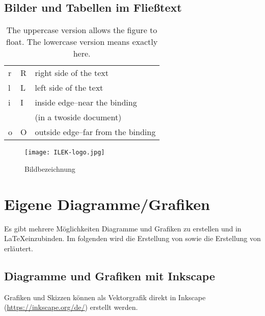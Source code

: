 \newpage

\subsection{Bilder und Tabellen im Fließtext}

\begin{wraptable}[]{o}[0cm]{9cm}
	\begin{center}
		\begin{tabular}{|l|l|l|}
			\hline
			r & R & right side of the text\\
			l & L & left side of the text\\
			i & I & inside edge–near the binding\\
			& &  (in a twoside document)\\
			o & O & outside edge–far from the binding\\
			\hline
		\end{tabular}
	\end{center}
	\caption{The uppercase version allows the figure to float. The lowercase version means exactly here.}%
\end{wraptable}

\blindtext[2]

\begin{wrapfigure}[]{o}[0cm]{6.5cm}
	\texttt{[image: ILEK-logo.jpg]}
	\caption{Bildbezeichnung}
	\label{fig:05_bild}
\end{wrapfigure}

\blindtext[2]

\newpage

\section{Eigene Diagramme/Grafiken}

Es gibt mehrere Möglichkeiten Diagramme und Grafiken zu erstellen und in  \LaTeX einzubinden. Im folgenden wird die Erstellung von  sowie die Erstellung von  erläutert.

\subsection{Diagramme und Grafiken mit Inkscape}
\label{subsec:python_inkscape}

Grafiken und Skizzen können als Vektorgrafik direkt in Inkscape (\url{https://inkscape.org/de/}) erstellt werden.

